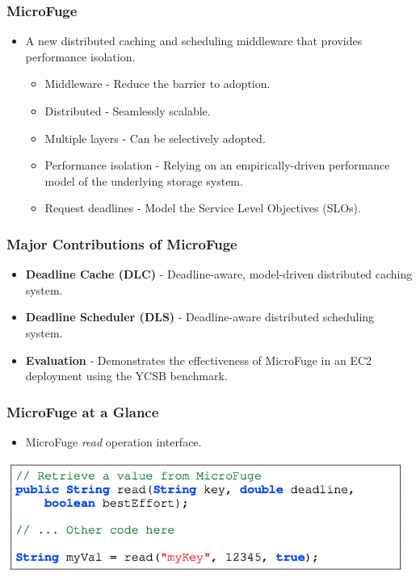 \documentclass{beamer}
\begin{document}
\begin{frame}
  \frametitle{MicroFuge}
  \begin{itemize}
  \item A new distributed caching and scheduling middleware that provides performance isolation.
    \begin{itemize}
    \item Middleware - Reduce the barrier to adoption.
    \item Distributed - Seamlessly scalable.
    \item Multiple layers - Can be selectively adopted.
    \item Performance isolation - Relying on an empirically-driven
      performance model of the underlying storage system.
    \item Request deadlines - Model the Service Level Objectives (SLOs).
    \end{itemize}
  \end{itemize}
\end {frame}


\begin{frame}
  \frametitle{Major Contributions of MicroFuge}
  \begin{itemize}
  \item \textbf{Deadline Cache (DLC)} - Deadline-aware, model-driven distributed
    caching system.
  \item \textbf{Deadline Scheduler (DLS)} - Deadline-aware distributed scheduling system.
  \item \textbf{Evaluation} - Demonstrates the effectiveness of MicroFuge in
    an EC2 deployment using the YCSB benchmark.
  \end{itemize}
\end {frame}



\begin{frame}
  \frametitle{MicroFuge at a Glance}
  \begin{itemize}
  \item MicroFuge \textit{read} operation interface.
  \end{itemize}
  \includegraphics[scale=0.40]{img/MicroFuge_protocol.png}

\end{frame}
\end{document}
